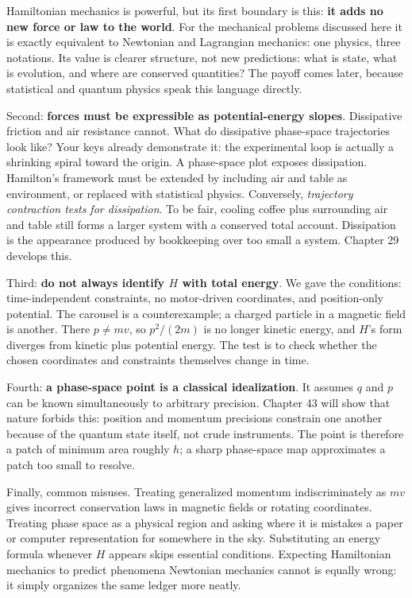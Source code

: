 
\begin{mainline}
Hamiltonian mechanics is powerful, but its first boundary is this: \textbf{it adds no new force or law to the world}. For the mechanical problems discussed here it is exactly equivalent to Newtonian and Lagrangian mechanics: one physics, three notations. Its value is clearer structure, not new predictions: what is state, what is evolution, and where are conserved quantities? The payoff comes later, because statistical and quantum physics speak this language directly.

Second: \textbf{forces must be expressible as potential-energy slopes}. Dissipative friction and air resistance cannot. What do dissipative phase-space trajectories look like? Your keys already demonstrate it: the experimental loop is actually a shrinking spiral toward the origin. A phase-space plot exposes dissipation. Hamilton's framework must be extended by including air and table as environment, or replaced with statistical physics. Conversely, \emph{trajectory contraction tests for dissipation}. To be fair, cooling coffee plus surrounding air and table still forms a larger system with a conserved total account. Dissipation is the appearance produced by bookkeeping over too small a system. Chapter 29 develops this.

Third: \textbf{do not always identify \(H\) with total energy}. We gave the conditions: time-independent constraints, no motor-driven coordinates, and position-only potential. The carousel is a counterexample; a charged particle in a magnetic field is another. There \(p\neq mv\), so \(p^{2}/(2m)\) is no longer kinetic energy, and \(H\)'s form diverges from kinetic plus potential energy. The test is to check whether the chosen coordinates and constraints themselves change in time.

Fourth: \textbf{a phase-space point is a classical idealization}. It assumes \(q\) and \(p\) can be known simultaneously to arbitrary precision. Chapter 43 will show that nature forbids this: position and momentum precisions constrain one another because of the quantum state itself, not crude instruments. The point is therefore a patch of minimum area roughly \(h\); a sharp phase-space map approximates a patch too small to resolve.

Finally, common misuses. Treating generalized momentum indiscriminately as \(mv\) gives incorrect conservation laws in magnetic fields or rotating coordinates. Treating phase space as a physical region and asking where it is mistakes a paper or computer representation for somewhere in the sky. Substituting an energy formula whenever \(H\) appears skips essential conditions. Expecting Hamiltonian mechanics to predict phenomena Newtonian mechanics cannot is equally wrong: it simply organizes the same ledger more neatly.
\end{mainline}


